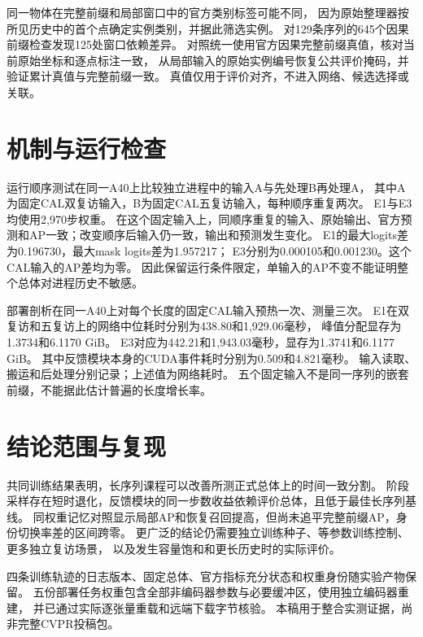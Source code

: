 \documentclass[10pt,twocolumn]{ctexart}
\begin{document}
同一物体在完整前缀和局部窗口中的官方类别标签可能不同，
因为原始整理器按所见历史中的首个点确定实例类别，并据此筛选实例。
对129条序列的645个因果前缀检查发现125处窗口依赖差异。
对照统一使用官方因果完整前缀真值，核对当前原始坐标和逐点标注一致，
从局部输入的原始实例编号恢复公共评价掩码，并验证累计真值与完整前缀一致。
真值仅用于评价对齐，不进入网络、候选选择或关联。



\section{机制与运行检查}



运行顺序测试在同一A40上比较独立进程中的输入A与先处理B再处理A，
其中A为固定CAL双复访输入，B为固定CAL五复访输入，每种顺序重复两次。
E1与E3均使用2,970步权重。
在这个固定输入上，同顺序重复的输入、原始输出、官方预测和AP一致；改变顺序后输入仍一致，输出和预测发生变化。
E1的最大logits差为0.196730，最大mask logits差为1.957217；
E3分别为0.000105和0.001230。这个CAL输入的AP差均为零。
因此保留运行条件限定，单输入的AP不变不能证明整个总体对进程历史不敏感。



部署剖析在同一A40上对每个长度的固定CAL输入预热一次、测量三次。
E1在双复访和五复访上的网络中位耗时分别为438.80和1,929.06毫秒，
峰值分配显存为1.3734和6.1170 GiB。
E3对应为442.21和1,943.03毫秒，显存为1.3741和6.1177 GiB。
其中反馈模块本身的CUDA事件耗时分别为0.509和4.821毫秒。
输入读取、搬运和后处理分别记录；上述值为网络耗时。
五个固定输入不是同一序列的嵌套前缀，不能据此估计普遍的长度增长率。

\section{结论范围与复现}

共同训练结果表明，长序列课程可以改善所测正式总体上的时间一致分割。
阶段采样存在短时退化，反馈模块的同一步数收益依赖评价总体，且低于最佳长序列基线。
同权重记忆对照显示局部AP和恢复召回提高，但尚未追平完整前缀AP，身份切换率差的区间跨零。
更广泛的结论仍需要独立训练种子、等参数训练控制、更多独立复访场景，
以及发生容量饱和和更长历史时的实际评价。

四条训练轨迹的日志版本、固定总体、官方指标充分状态和权重身份随实验产物保留。
五份部署任务权重包含全部非编码器参数与必要缓冲区，使用独立编码器重建，
并已通过实际逐张量重载和远端下载字节核验。
本稿用于整合实测证据，尚非完整CVPR投稿包。



\end{document}

